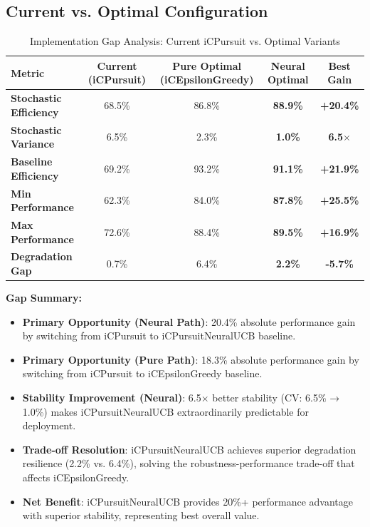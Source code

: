 \documentclass[12pt,a4paper]{article}
\newcommand{\primarytext}[1]{\textcolor{primaryblue}{\textbf{#1}}}
\newcommand{\success}[1]{\textcolor{accentgreen}{\textbf{#1}}}
\newcommand{\warning}[1]{\textcolor{warningred}{\textbf{#1}}}
\newcommand{\neural}[1]{\textcolor{neuralcolor}{\textbf{#1}}}
\begin{document}
\subsection{Current vs. Optimal Configuration}

\begin{table}[H]
\centering
\caption{Implementation Gap Analysis: Current iCPursuit vs. Optimal Variants}
\label{tab:implementation-gap}
\begin{tabular}{@{}lcccc@{}}
\toprule
\textbf{Metric} & \textbf{Current (iCPursuit)} & \textbf{Pure Optimal (iCEpsilonGreedy)} & \textbf{Neural Optimal} & \textbf{Best Gain} \\
\midrule
\warning{Stochastic Efficiency} & 68.5\% & 86.8\% & \neural{88.9\%} & \neural{+20.4\%} \\
\warning{Stochastic Variance} & 6.5\% & 2.3\% & \neural{1.0\%} & \neural{6.5$\times$} \\
\warning{Baseline Efficiency} & 69.2\% & 93.2\% & \neural{91.1\%} & \neural{+21.9\%} \\
\warning{Min Performance} & 62.3\% & 84.0\% & \neural{87.8\%} & \neural{+25.5\%} \\
\warning{Max Performance} & 72.6\% & 88.4\% & \neural{89.5\%} & \neural{+16.9\%} \\
\midrule
\warning{Degradation Gap} & 0.7\% & 6.4\% & \neural{2.2\%} & \neural{-5.7\%} \\
\bottomrule
\end{tabular}
\end{table}

\textbf{Gap Summary:}
\begin{itemize}
\item \neural{Primary Opportunity (Neural Path)}: 20.4\% absolute performance gain by switching from iCPursuit to iCPursuitNeuralUCB baseline.
\item \primarytext{Primary Opportunity (Pure Path)}: 18.3\% absolute performance gain by switching from iCPursuit to iCEpsilonGreedy baseline.
\item \neural{Stability Improvement (Neural)}: 6.5$\times$ better stability (CV: 6.5\% → 1.0\%) makes iCPursuitNeuralUCB extraordinarily predictable for deployment.
\item \warning{Trade-off Resolution}: iCPursuitNeuralUCB achieves superior degradation resilience (2.2\% vs. 6.4\%), solving the robustness-performance trade-off that affects iCEpsilonGreedy.
\item \success{Net Benefit}: iCPursuitNeuralUCB provides 20\%+ performance advantage with superior stability, representing best overall value.
\end{itemize}
\end{document}
